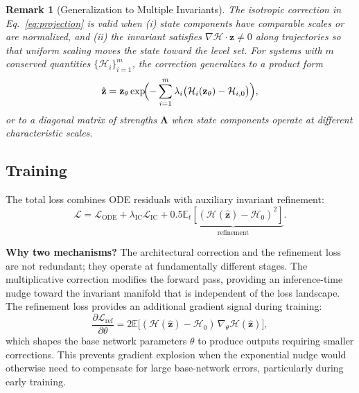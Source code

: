 \documentclass[pdflatex,sn-mathphys-num]{sn-jnl}
\theoremstyle{thmstyleone}%
\theoremstyle{thmstyletwo}%
\newtheorem{remark}{Remark}%
\theoremstyle{thmstylethree}%
\begin{document}
	\begin{remark}[Generalization to Multiple Invariants]\label{rem:generalization}
		The isotropic correction in Eq.~\eqref{eq:projection} is valid when (i) state components have comparable scales or are normalized, and (ii) the invariant satisfies $\nabla \mathcal{H} \cdot \mathbf{z} \neq 0$ along trajectories so that uniform scaling moves the state toward the level set. For systems with $m$ conserved quantities $\{\mathcal{H}_i\}_{i=1}^{m}$, the correction generalizes to a product form
		\begin{equation}
		\hat{\mathbf{z}} = \mathbf{z}_\theta \exp\!\Bigl(-\sum_{i=1}^{m} \lambda_i \bigl(\mathcal{H}_i(\mathbf{z}_\theta) - \mathcal{H}_{i,0}\bigr)\Bigr),
		\end{equation}
		or to a diagonal matrix of strengths $\boldsymbol{\Lambda}$ when state components operate at different characteristic scales.
	\end{remark}
	
	\subsection{Training}\label{subsec4.2}
	
	The total loss combines ODE residuals with auxiliary invariant refinement:
	\begin{equation}
	\mathcal{L} = \mathcal{L}_{\text{ODE}} + \lambda_{\text{IC}}\mathcal{L}_{\text{IC}} + 0.5\underbrace{\mathbb{E}_t[(\mathcal{H}(\hat{\mathbf{z}}) - \mathcal{H}_0)^2]}_{\text{refinement}}.
	\label{eq:total_loss}
	\end{equation}
	
	\textbf{Why two mechanisms?} The architectural correction and the refinement loss are not redundant; they operate at fundamentally different stages. The multiplicative correction modifies the forward pass, providing an inference-time nudge toward the invariant manifold that is independent of the loss landscape. The refinement loss provides an additional gradient signal during training:
	\begin{equation}
	\frac{\partial \mathcal{L}_{\text{ref}}}{\partial \theta} = 2\mathbb{E}\bigl[(\mathcal{H}(\hat{\mathbf{z}}) - \mathcal{H}_0)\, \nabla_\theta \mathcal{H}(\hat{\mathbf{z}})\bigr],
	\end{equation}
	which shapes the base network parameters $\theta$ to produce outputs requiring smaller corrections. This prevents gradient explosion when the exponential nudge would otherwise need to compensate for large base-network errors, particularly during early training.
	
\end{document}
